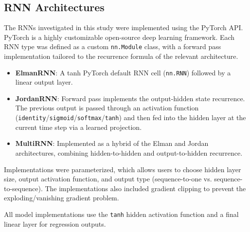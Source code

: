 \documentclass[conference]{IEEEtran}
\begin{document}
\subsection{\textbf{RNN Architectures}}
The RNNs investigated in this study were implemented using the PyTorch API. PyTorch is a highly customizable open-source deep learning framework. Each RNN type was defined as a custom \texttt{nn.Module} class, with a forward pass implementation tailored to the recurrence formula of the relevant architecture.
\begin{itemize}
    \item \textbf{ElmanRNN}: A tanh PyTorch default RNN cell (\texttt{nn.RNN}) followed by a linear output layer.
    \item \textbf{JordanRNN}: Forward pass implements the output-hidden state recurrence. The previous output is passed through an activation function (\texttt{identity}/\texttt{sigmoid}/\texttt{softmax}/\texttt{tanh}) and then fed into the hidden layer at the current time step via a learned projection.
    \item \textbf{MultiRNN}: Implemented as a hybrid of the Elman and Jordan architectures, combining hidden-to-hidden and output-to-hidden recurrence.
\end{itemize}
Implementations were parameterized, which allows users to choose hidden layer size, output activation function, and output type (sequence-to-one vs. sequence-to-sequence). The implementations also included gradient clipping to prevent the exploding/vanishing gradient problem.

All model implementations use the \texttt{tanh} hidden activation function and a final linear layer for regression outputs.
\end{document}
